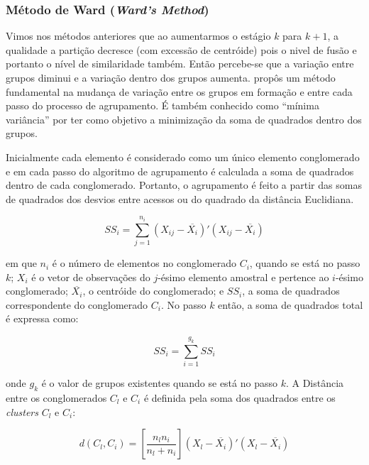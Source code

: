 \documentclass[
  openany]{book}
\begin{document}
\hypertarget{muxe9todo-de-ward-wards-method}{%
\subsubsection{\texorpdfstring{Método de Ward (\emph{Ward's Method})}{Método de Ward (Ward's Method)}}\label{muxe9todo-de-ward-wards-method}}

Vimos nos métodos anteriores que ao aumentarmos o estágio \(k\) para \(k+1\), a qualidade a partição decresce (com excessão de centróide) pois o nivel de fusão e portanto o nível de similaridade também. Então percebe-se que a variação entre grupos diminui e a variação dentro dos grupos aumenta. \citet{ward1963hierarchical} propôs um método fundamental na mudança de variação entre os grupos em formação e entre cada passo do processo de agrupamento. É também conhecido como ``mínima variância'' por ter como objetivo a minimização da soma de quadrados dentro dos grupos.

Inicialmente cada elemento é considerado como um único elemento conglomerado e em cada passo do algoritmo de agrupamento é calculada a soma de quadrados dentro de cada conglomerado. Portanto, o agrupamento é feito a partir das somas de quadrados dos desvios entre acessos ou do quadrado da distância Euclidiana.

\begin{equation}
 SS_i=\displaystyle \sum^{n_i}_{j=1} (X_{ij}-\overline{X_i})'(X_{ij}-\overline{X_i})
 \label{eq:sumquadraeuclid}
\end{equation}

em que \(n_i\) é o número de elementos no conglomerado \(C_i\), quando se está no passo \(k\); \(X_i\) é o vetor de observações do \(j\)-ésimo elemento amostral e pertence ao \(i\)-ésimo conglomerado; \(\overline{X_i}\), o centróide do conglomerado; e \(SS_i\), a soma de quadrados correspondente do conglomerado \(C_i\). No passo \(k\) então, a soma de quadrados total é expressa como:

\begin{equation}
 SS_i=\displaystyle \sum^{g_k}_{i=1}SS_i
 \label{eq:sumquadrak}
\end{equation}

onde \(g_k\) é o valor de grupos existentes quando se está no passo \(k\).
A Distância entre os conglomerados \(C_l\) e \(C_i\) é definida pela soma dos quadrados entre os \emph{clusters} \(C_l\) e \(C_i\):

\begin{equation}
 d(C_l,C_i)=[\frac{n_l n_i}{n_l+n_i}] (X_{l}-\overline{X_i})'(X_{l}-\overline{X_i})
 \label{eq:distward}
\end{equation}
\end{document}
